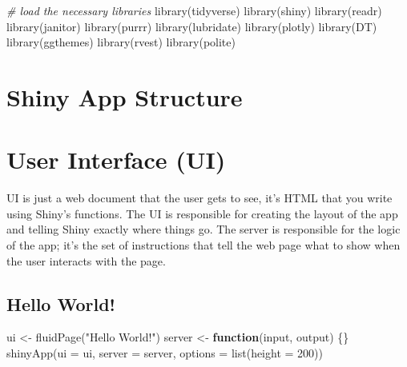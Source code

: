 \documentclass[
]{book}
\newenvironment{Shaded}{\begin{snugshade}}{\end{snugshade}}
\newcommand{\AttributeTok}[1]{\textcolor[rgb]{0.77,0.63,0.00}{#1}}
\newcommand{\CommentTok}[1]{\textcolor[rgb]{0.56,0.35,0.01}{\textit{#1}}}
\newcommand{\ControlFlowTok}[1]{\textcolor[rgb]{0.13,0.29,0.53}{\textbf{#1}}}
\newcommand{\DecValTok}[1]{\textcolor[rgb]{0.00,0.00,0.81}{#1}}
\newcommand{\FunctionTok}[1]{\textcolor[rgb]{0.00,0.00,0.00}{#1}}
\newcommand{\NormalTok}[1]{#1}
\newcommand{\OtherTok}[1]{\textcolor[rgb]{0.56,0.35,0.01}{#1}}
\newcommand{\StringTok}[1]{\textcolor[rgb]{0.31,0.60,0.02}{#1}}
\begin{document}
\begin{Shaded}
\begin{Highlighting}[]
\CommentTok{\# load the necessary libraries}
\FunctionTok{library}\NormalTok{(tidyverse)}
\FunctionTok{library}\NormalTok{(shiny)}
\FunctionTok{library}\NormalTok{(readr)}
\FunctionTok{library}\NormalTok{(janitor)}
\FunctionTok{library}\NormalTok{(purrr)}
\FunctionTok{library}\NormalTok{(lubridate)}
\FunctionTok{library}\NormalTok{(plotly)}
\FunctionTok{library}\NormalTok{(DT)}
\FunctionTok{library}\NormalTok{(ggthemes)}
\FunctionTok{library}\NormalTok{(rvest)}
\FunctionTok{library}\NormalTok{(polite)}
\end{Highlighting}
\end{Shaded}

\hypertarget{shiny-app-structure}{%
\section{Shiny App Structure}\label{shiny-app-structure}}

\hypertarget{user-interface-ui}{%
\section{User Interface (UI)}\label{user-interface-ui}}

UI is just a web document that the user gets to see, it's HTML that you write using Shiny's functions. The UI is responsible for creating the layout of the app and telling Shiny exactly where things go. The server is responsible for the logic of the app; it's the set of instructions that tell the web page what to show when the user interacts with the page.

\hypertarget{hello-world}{%
\subsection{Hello World!}\label{hello-world}}

\begin{Shaded}
\begin{Highlighting}[]
\NormalTok{ui }\OtherTok{\textless{}{-}} \FunctionTok{fluidPage}\NormalTok{(}\StringTok{"Hello World!"}\NormalTok{)}
\NormalTok{server }\OtherTok{\textless{}{-}} \ControlFlowTok{function}\NormalTok{(input, output) \{\}}
\FunctionTok{shinyApp}\NormalTok{(}\AttributeTok{ui =}\NormalTok{ ui, }\AttributeTok{server =}\NormalTok{ server, }\AttributeTok{options =} \FunctionTok{list}\NormalTok{(}\AttributeTok{height =} \DecValTok{200}\NormalTok{))}
\end{Highlighting}
\end{Shaded}
\end{document}

